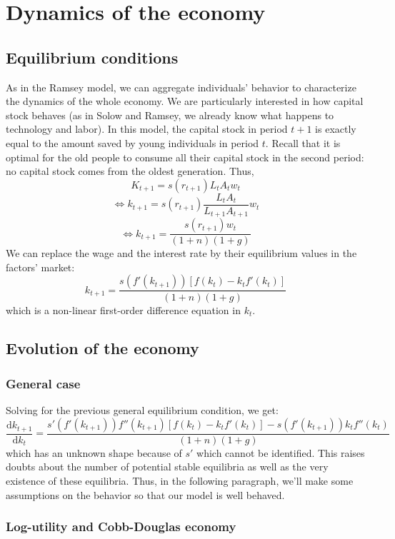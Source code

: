 \documentclass[12pt]{report}
\def\D{\mathrm{d}}
\begin{document}
\section{Dynamics of the economy}

\subsection{Equilibrium conditions}

As in the Ramsey model, we can aggregate individuals' behavior to characterize the dynamics of the whole economy. We are particularly interested in how capital stock behaves (as in Solow and Ramsey, we already know what happens to technology and labor). In this model, the capital stock in period $t+1$ is exactly equal to the amount saved by young individuals in period $t$. Recall that it is optimal for the old people to consume all their capital stock in the second period: no capital stock comes from the oldest generation. Thus, $$K_{t+1} = s(r_{t+1})L_tA_tw_t $$ $$\Leftrightarrow k_{t+1} = s(r_{t+1})\frac{L_tA_t}{L_{t+1}A_{t+1}}w_t $$ $$\Leftrightarrow k_{t+1} = \frac{s(r_{t+1})w_t}{(1+n)(1+g)}$$ We can replace the wage and the interest rate by their equilibrium values in the factors' market: $$k_{t+1} = \frac{s(f'(k_{t+1}))[f(k_t) - k_tf'(k_t)]}{(1+n)(1+g)} $$ which is a non-linear first-order difference equation in $k_t$.

\subsection{Evolution of the economy}

\subsubsection{General case}

Solving for the previous general equilibrium condition, we get: $$\frac{\D k_{t+1}}{\D k_t} = \frac{s'(f'(k_{t+1}))f''(k_{t+1})[f(k_t) -k_tf'(k_t)] - s(f'(k_{t+1}))k_tf''(k_t)}{(1+n)(1+g)} $$ which has an unknown shape because of $s'$ which cannot be identified. This raises doubts about the number of potential stable equilibria as well as the very existence of these equilibria. Thus, in the following paragraph, we'll make some assumptions on the behavior so that our model is well behaved.

\subsubsection{Log-utility and Cobb-Douglas economy}
\end{document}
